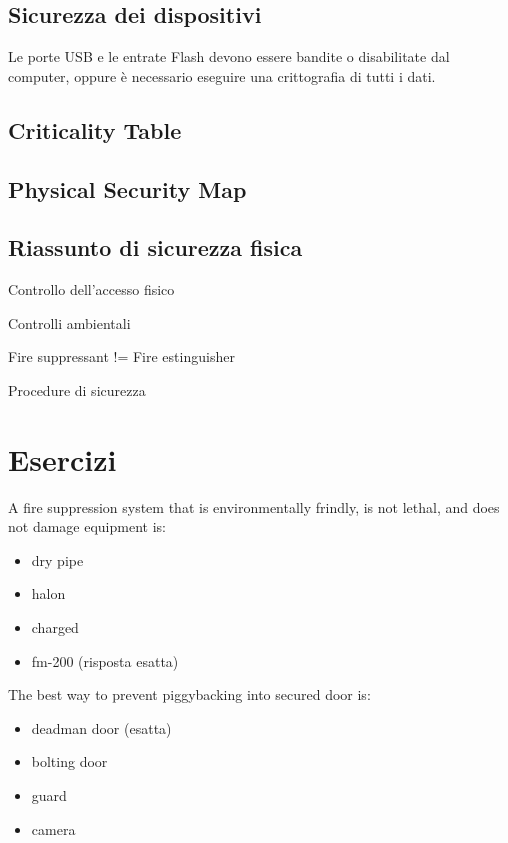 \subsection{Sicurezza dei dispositivi}

Le porte USB e le entrate Flash devono essere bandite o disabilitate dal 
computer, oppure è necessario eseguire una crittografia di tutti i dati.


\subsection{Criticality Table}


\subsection{Physical Security Map}

\subsection{Riassunto di sicurezza fisica}

Controllo dell'accesso fisico

Controlli ambientali

Fire suppressant != Fire estinguisher

Procedure di sicurezza

\section{Esercizi}








A fire suppression system that is environmentally frindly, is not lethal, and 
does not damage equipment is:
\begin{itemize}
\item dry pipe
\item halon
\item charged
\item fm-200 (risposta esatta)
\end{itemize}

The best way to prevent piggybacking into secured door is:
\begin{itemize}
\item deadman door (esatta)
\item bolting door
\item guard
\item camera
\end{itemize}


